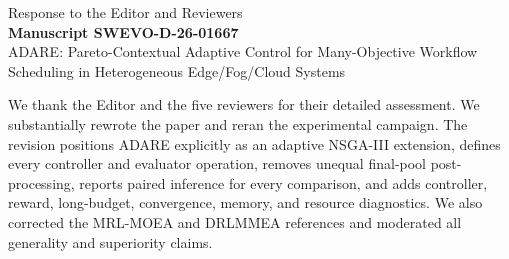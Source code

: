 \documentclass[11pt]{article}
\begin{document}
\begin{center}
{\Large Response to the Editor and Reviewers}\\[0.5em]
{\bfseries Manuscript SWEVO-D-26-01667}\\
ADARE: Pareto-Contextual Adaptive Control for Many-Objective Workflow Scheduling in Heterogeneous Edge/Fog/Cloud Systems
\end{center}

We thank the Editor and the five reviewers for their detailed assessment. We substantially rewrote the paper and reran the experimental campaign. The revision positions ADARE explicitly as an adaptive NSGA-III extension, defines every controller and evaluator operation, removes unequal final-pool post-processing, reports paired inference for every comparison, and adds controller, reward, long-budget, convergence, memory, and resource diagnostics. We also corrected the MRL-MOEA and DRLMMEA references and moderated all generality and superiority claims.
\end{document}
